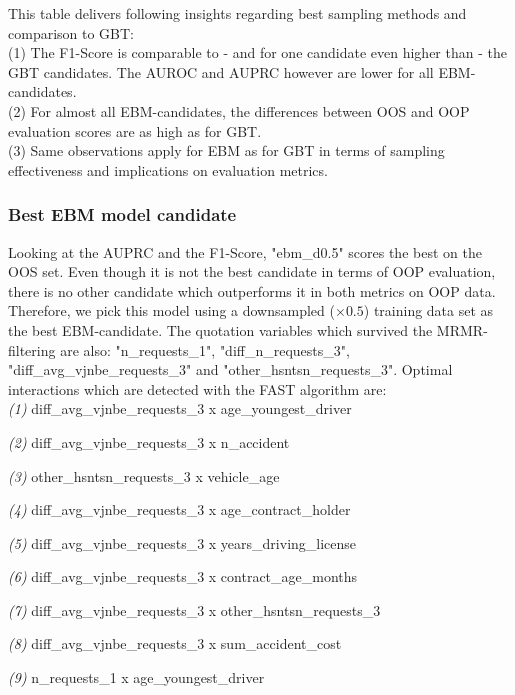 \documentclass[12pt,titlepage]{article}
\begin{document}
\noindent
This table delivers following insights regarding best sampling methods and comparison to GBT: \\
(1) The F1-Score is comparable to - and for one candidate even higher than - the GBT candidates. The AUROC and AUPRC however are lower for all EBM-candidates. \\
(2) For almost all EBM-candidates, the differences between OOS and OOP evaluation scores are as high as for GBT. \\
(3) Same observations apply for EBM as for GBT in terms of sampling effectiveness and implications on evaluation metrics. \\

\subsubsection*{Best EBM model candidate}

Looking at the AUPRC and the F1-Score, "ebm\_d0.5" scores the best on the OOS set. Even though it is not the best candidate in terms of OOP evaluation, there is no other candidate which outperforms it in both metrics on OOP data. Therefore, we pick this model using a downsampled ($\times 0.5$) training data set as the best EBM-candidate. The quotation variables which survived the MRMR-filtering are also: "n\_requests\_1", "diff\_n\_requests\_3", "diff\_avg\_vjnbe\_requests\_3" and "other\_hsntsn\_requests\_3". Optimal interactions which are detected with the FAST algorithm are: \\

\vspace{3mm}
\textit{(1)} diff\_avg\_vjnbe\_requests\_3 x age\_youngest\_driver \par
\textit{(2)} diff\_avg\_vjnbe\_requests\_3 x n\_accident \par
\textit{(3)} other\_hsntsn\_requests\_3 x vehicle\_age \par
\textit{(4)} diff\_avg\_vjnbe\_requests\_3 x age\_contract\_holder \par
\textit{(5)} diff\_avg\_vjnbe\_requests\_3 x years\_driving\_license \par
\textit{(6)} diff\_avg\_vjnbe\_requests\_3 x contract\_age\_months \par
\textit{(7)} diff\_avg\_vjnbe\_requests\_3 x other\_hsntsn\_requests\_3 \par
\textit{(8)} diff\_avg\_vjnbe\_requests\_3 x sum\_accident\_cost \par
\textit{(9)} n\_requests\_1 x age\_youngest\_driver \\
\vspace{1mm}
\end{document}
